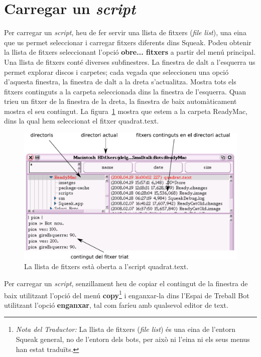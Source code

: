 \section{Carregar un \emph{script}}
Per carregar un \emph{script}, heu de fer servir una llista de fitxers (\emph{file list}), una eina que us permet seleccionar i carregar fitxers diferents dins Squeak. Podeu obtenir la llista de fitxers seleccionant l'opció \textbf{obre... fitxers} a partir del menú principal. Una llista de fitxers conté diverses subfinestres. La finestra de dalt a l'esquerra us permet explorar discos i carpetes; cada vegada que seleccioneu una opció d'aquesta finestra, la finestra de dalt a la dreta s'actualitza. Mostra tots els fitxers continguts a la carpeta seleccionada dins la finestra de l'esquerra. Quan trieu un fitxer de la finestra de la dreta, la finestra de baix automàticament mostra el seu contingut. La figura~\ref{fig0506} mostra que estem a la carpeta \textsf{ReadyMac}, dins la qual hem seleccionat el fitxer \textsf{quadrat.text}.

\begin{figure}[h]
\begin{center}
\includegraphics[scale=0.65]{Imatges/figura5-6}
\end{center}
\caption{La llista de fitxers està oberta a l'script \textsf{\upshape quadrat.text}.}
\label{fig0506}
\end{figure}

Per carregar un \emph{script}, senzillament heu de copiar el contingut de la finestra de baix utilitzant l'opció del menú \textbf{copy}\footnote{\emph{Nota del Traductor:} La llista de fitxers (\emph{file list}) és una eina de l'entorn Squeak general, no de l'entorn dels bots, per això ni l'eina ni els seus menus han estat traduïts.} i enganxar-la dins l'\textsf{Espai de Treball Bot} utilitzant l'opció \textbf{enganxar}, tal com faríeu amb qualsevol editor de text.

